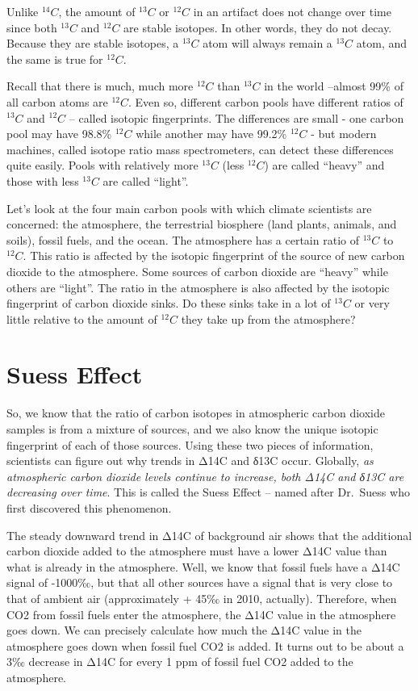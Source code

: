 \documentclass[
]{book}
\begin{document}
Unlike \({}^{14}C\), the amount of \({}^{13}C\) or \({}^{12}C\) in an artifact does not change over time since both \({}^{13}C\) and \({}^{12}C\) are stable isotopes. In other words, they do not decay. Because they are stable isotopes, a \({}^{13}C\) atom will always remain a \({}^{13}C\) atom, and the same is true for \({}^{12}C\).

Recall that there is much, much more \({}^{12}C\) than \({}^{13}C\) in the world --almost 99\% of all carbon atoms are \({}^{12}C\). Even so, different carbon pools have different ratios of \({}^{13}C\) and \({}^{12}C\) -- called isotopic fingerprints. The differences are small - one carbon pool may have 98.8\% \({}^{12}C\) while another may have 99.2\% \({}^{12}C\) - but modern machines, called isotope ratio mass spectrometers, can detect these differences quite easily. Pools with relatively more \({}^{13}C\) (less \({}^{12}C\)) are called ``heavy'' and those with less \({}^{13}C\) are called ``light''.

Let's look at the four main carbon pools with which climate scientists are concerned: the atmosphere, the terrestrial biosphere (land plants, animals, and soils), fossil fuels, and the ocean. The atmosphere has a certain ratio of \({}^{13}C\) to \({}^{12}C\). This ratio is affected by the isotopic fingerprint of the source of new carbon dioxide to the atmosphere. Some sources of carbon dioxide are ``heavy'' while others are ``light''. The ratio in the atmosphere is also affected by the isotopic fingerprint of carbon dioxide sinks. Do these sinks take in a lot of \({}^{13}C\) or very little relative to the amount of \({}^{12}C\) they take up from the atmosphere?

\hypertarget{suess-effect}{%
\section{Suess Effect}\label{suess-effect}}

So, we know that the ratio of carbon isotopes in atmospheric carbon dioxide samples is from a mixture of sources, and we also know the unique isotopic fingerprint of each of those sources. Using these two pieces of information, scientists can figure out why trends in Δ14C and δ13C occur. Globally, \emph{as atmospheric carbon dioxide levels continue to increase, both Δ14C and δ13C are decreasing over time}. This is called the Suess Effect -- named after Dr.~Suess who first discovered this phenomenon.

The steady downward trend in Δ14C of background air shows that the additional carbon dioxide added to the atmosphere must have a lower Δ14C value than what is already in the atmosphere. Well, we know that fossil fuels have a Δ14C signal of -1000‰, but that all other sources have a signal that is very close to that of ambient air (approximately + 45‰ in 2010, actually). Therefore, when CO2 from fossil fuels enter the atmosphere, the Δ14C value in the atmosphere goes down. We can precisely calculate how much the Δ14C value in the atmosphere goes down when fossil fuel CO2 is added. It turns out to be about a 3‰ decrease in Δ14C for every 1 ppm of fossil fuel CO2 added to the atmosphere.
\end{document}
